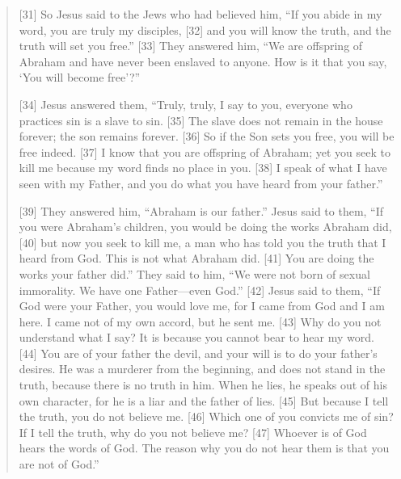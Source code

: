 \begin{quote}
  [31] So Jesus said to the Jews who had believed him, “If you abide in my word, you are truly my disciples, [32] and you will know the truth, and the truth will set you free.” [33] They answered him, “We are offspring of Abraham and have never been enslaved to anyone. How is it that you say, ‘You will become free’?”

  [34] Jesus answered them, “Truly, truly, I say to you, everyone who practices sin is a slave to sin. [35] The slave does not remain in the house forever; the son remains forever. [36] So if the Son sets you free, you will be free indeed. [37] I know that you are offspring of Abraham; yet you seek to kill me because my word finds no place in you. [38] I speak of what I have seen with my Father, and you do what you have heard from your father.”

  [39] They answered him, “Abraham is our father.” Jesus said to them, “If you were Abraham’s children, you would be doing the works Abraham did, [40] but now you seek to kill me, a man who has told you the truth that I heard from God. This is not what Abraham did. [41] You are doing the works your father did.” They said to him, “We were not born of sexual immorality. We have one Father—even God.” [42] Jesus said to them, “If God were your Father, you would love me, for I came from God and I am here. I came not of my own accord, but he sent me. [43] Why do you not understand what I say? It is because you cannot bear to hear my word. [44] You are of your father the devil, and your will is to do your father’s desires. He was a murderer from the beginning, and does not stand in the truth, because there is no truth in him. When he lies, he speaks out of his own character, for he is a liar and the father of lies. [45] But because I tell the truth, you do not believe me. [46] Which one of you convicts me of sin? If I tell the truth, why do you not believe me? [47] Whoever is of God hears the words of God. The reason why you do not hear them is that you are not of God.”


\end{quote}
